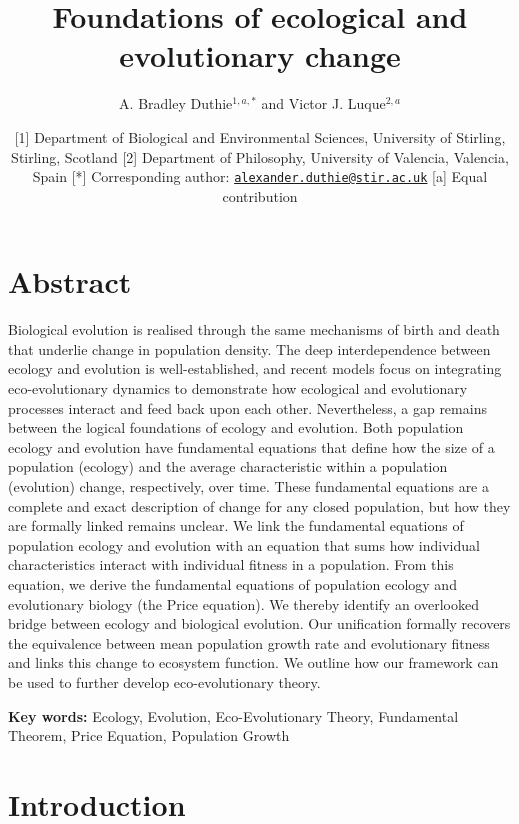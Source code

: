 \documentclass[
]{article}
\title{Foundations of ecological and evolutionary change}
\author{A. Bradley Duthie\(^{1,a,*}\) and Victor J. Luque\(^{2,a}\)}
\date{{[}1{]} Department of Biological and Environmental Sciences,
University of Stirling, Stirling, Scotland {[}2{]} Department of
Philosophy, University of Valencia, Valencia, Spain {[}*{]}
Corresponding author:
\href{mailto:alexander.duthie@stir.ac.uk}{\nolinkurl{alexander.duthie@stir.ac.uk}}
{[}a{]} Equal contribution}
\begin{document}
\maketitle

\section{Abstract}\label{abstract}

Biological evolution is realised through the same mechanisms of birth
and death that underlie change in population density. The deep
interdependence between ecology and evolution is well-established, and
recent models focus on integrating eco-evolutionary dynamics to
demonstrate how ecological and evolutionary processes interact and feed
back upon each other. Nevertheless, a gap remains between the logical
foundations of ecology and evolution. Both population ecology and
evolution have fundamental equations that define how the size of a
population (ecology) and the average characteristic within a population
(evolution) change, respectively, over time. These fundamental equations
are a complete and exact description of change for any closed
population, but how they are formally linked remains unclear. We link
the fundamental equations of population ecology and evolution with an
equation that sums how individual characteristics interact with
individual fitness in a population. From this equation, we derive the
fundamental equations of population ecology and evolutionary biology
(the Price equation). We thereby identify an overlooked bridge between
ecology and biological evolution. Our unification formally recovers the
equivalence between mean population growth rate and evolutionary fitness
and links this change to ecosystem function. We outline how our
framework can be used to further develop eco-evolutionary theory.

\textbf{Key words:} Ecology, Evolution, Eco-Evolutionary Theory,
Fundamental Theorem, Price Equation, Population Growth

\section{Introduction}\label{introduction}
\end{document}
